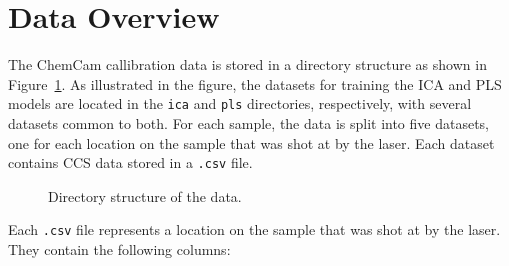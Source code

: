 \section{Data Overview}\label{sec:data_overview}
The ChemCam callibration data is stored in a directory structure as shown in Figure~\ref{fig:directory_structure}.
As illustrated in the figure, the datasets for training the ICA and PLS models are located in the \texttt{ica} and \texttt{pls} directories, respectively, with several datasets common to both.
For each sample, the data is split into five datasets, one for each location on the sample that was shot at by the laser.
Each dataset contains CCS data stored in a \texttt{.csv} file.

\begin{figure}
\caption{Directory structure of the data.}
\label{fig:directory_structure}
\end{figure}

Each \texttt{.csv} file represents a location on the sample that was shot at by the laser.
They contain the following columns:

